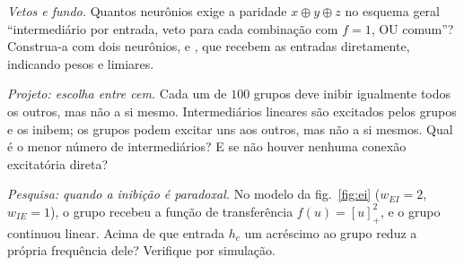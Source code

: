 \begin{exercise}[\lvlB]
\label{ex:03:6}
\emph{Vetos e fundo.} Quantos neurônios exige a paridade $x\oplus y\oplus z$ no esquema geral ``intermediário  por entrada, veto para cada combinação com $f=1$, OU comum''? Construa-a com dois neurônios,  e , que recebem as entradas diretamente, indicando pesos e limiares.
\end{exercise}

\begin{exercise}[\lvlC]
\label{ex:03:7}
\emph{Projeto: escolha entre cem.} Cada um de $100$ grupos  deve inibir igualmente todos os outros, mas não a si mesmo. Intermediários  lineares são excitados pelos grupos e os inibem; os grupos podem excitar uns aos outros, mas não a si mesmos. Qual é o menor número de intermediários? E se não houver nenhuma conexão excitatória direta?
\end{exercise}

\begin{exercise}[\lvlC]
\label{ex:03:8}
\emph{Pesquisa: quando a inibição é paradoxal.} No modelo da fig.~\ref{fig:ei} ($w_{EI}=2$, $w_{IE}=1$), o grupo  recebeu a função de transferência $f(u)=[u]_+^2$, e o grupo  continuou linear. Acima de que entrada $h_c$ um acréscimo ao grupo  reduz a própria frequência dele? Verifique por simulação.
\end{exercise}
